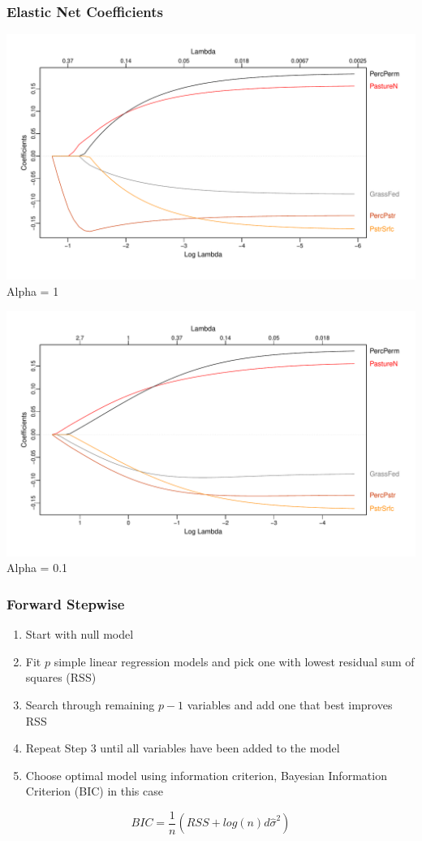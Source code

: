 \documentclass{beamer}
\begin{document}
\begin{frame}
\frametitle{Elastic Net Coefficients}
\centering

\includegraphics[scale=0.26]{elasticplot1}
Alpha = 1


\includegraphics[scale=0.26]{elasticplot2}
Alpha = 0.1
\end{frame}


\begin{frame}
\frametitle{Forward Stepwise}

\begin{enumerate}
	\item Start with null model
	\item Fit $p$ simple linear regression models and pick one with lowest residual sum of squares (RSS)
	\item Search through remaining $p - 1$ variables and add one that best improves RSS
	\item Repeat Step 3 until all variables have been added to the model
	\item Choose optimal model using information criterion, Bayesian Information Criterion (BIC) in this case
\end{enumerate}

\[ BIC =  \frac{1}{n}(RSS + log(n)d\hat{\sigma}^2)\]

\end{frame}
\end{document}
